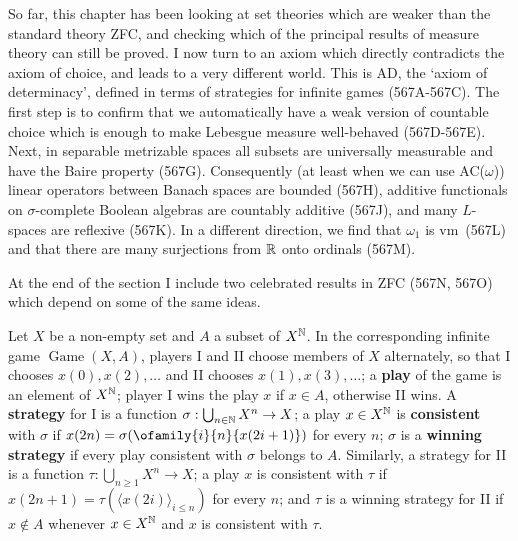 
\def\Game{\mathop{\text{Game}}\nolimits}
\def\StrI{\mathop{\text{Str}}\nolimits_{\text{I}}}
\def\StrII{\mathop{\text{Str}}\nolimits_{\text{II}}}
\def\WO{\mathop{\text{WO}}}

\def\chaptername{Choice and determinacy}
\def\sectionname{Determinacy}


So far, this chapter has been looking at set theories which are weaker than
the standard theory ZFC, and checking which of the principal results of
measure theory can still be proved.   I now turn to an axiom which directly
contradicts the axiom of choice, and leads to a very different world.
This is AD, the `axiom of determinacy', defined in terms of strategies for
infinite games (567A-567C).  %
The first step is to confirm that we automatically have a weak version of
countable choice which is enough to make Lebesgue measure well-behaved
(567D-567E).   Next, in separable metrizable spaces all
subsets are universally measurable and have the Baire property (567G).
Consequently (at least when we can use AC($\omega$)) linear operators
between Banach spaces are bounded (567H), additive functionals on
$\sigma$-complete Boolean algebras are countably additive (567J), and
many $L$-spaces are reflexive (567K).   In a different direction, we
find that $\omega_1$ is \2vm\ (567L) and that there are many surjections
from $\Bbb R$ onto ordinals (567M).

At the end of the section I include two celebrated results in ZFC
(567N, 567O) which depend on some of the same ideas.

  Let $X$ be a non-empty set and $A$ a subset of
$X^{\Bbb N}$.   In the corresponding infinite game $\Game(X,A)$, players I
and II choose members of $X$ alternately, so that I chooses
$x(0),x(2),\ldots$ and II chooses $x(1),x(3),\ldots$;  a {\bf play} of the
game is an element of $X^{\Bbb N}$;  player I wins the play $x$ if
$x\in A$, otherwise II wins.   A {\bf strategy} for I is a function
$\sigma:\bigcup_{n\in\Bbb N}X^n\to X$;  a play $x\in X^{\Bbb N}$ is {\bf
consistent} with $\sigma$ if
$x(2n)=\sigma(\ofamily{i}{n}{x(2i+1)})$ for every $n$;
$\sigma$ is a {\bf winning strategy} if every play consistent with $\sigma$
belongs to $A$.   Similarly, a strategy for II is a function
$\tau:\bigcup_{n\ge 1}X^n\to X$;  a play $x$ is consistent with $\tau$ if
$x(2n+1)=\tau(\langle x(2i)\rangle_{i\le n})$ for every $n$;  and $\tau$
is a winning strategy for II if
$x\notin A$ whenever $x\in X^{\Bbb N}$ and $x$ is consistent with $\tau$.

